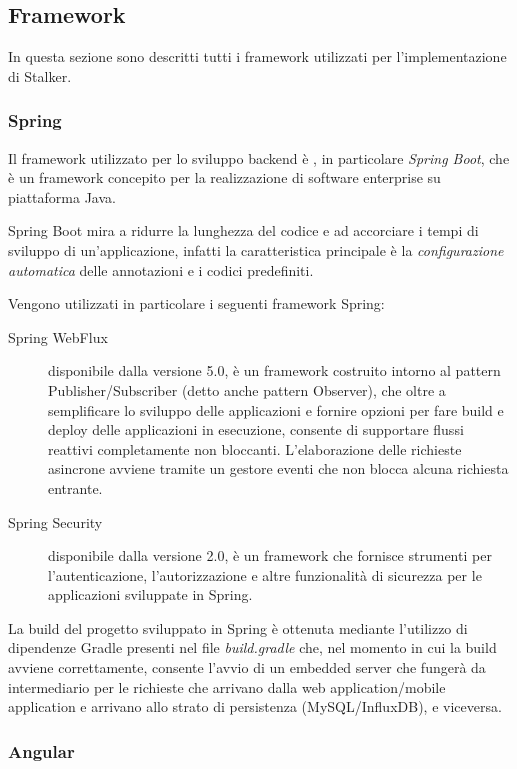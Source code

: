\documentclass[../manuale-sviluppatore.tex]{subfiles}
\begin{document}
\subsection{Framework}%
\label{sub:framework}
In questa sezione sono descritti tutti i framework utilizzati per l'implementazione di Stalker.

\subsubsection{Spring}%
\label{subs:spring}

Il framework utilizzato per lo sviluppo backend è , in particolare \textit{Spring Boot}, che è un framework concepito per la realizzazione di software enterprise su piattaforma Java.

Spring Boot mira a ridurre la lunghezza del codice e ad accorciare i tempi di sviluppo di un'applicazione, infatti la caratteristica principale è la \textit{configurazione automatica} delle annotazioni e i codici predefiniti.

Vengono utilizzati in particolare i seguenti framework Spring:
\begin{description}
  \item[Spring WebFlux] disponibile dalla versione 5.0, è un framework costruito intorno al pattern Publisher/Subscriber (detto anche pattern Observer), che oltre a semplificare lo sviluppo delle applicazioni e fornire opzioni per fare build e deploy delle applicazioni in esecuzione, consente di supportare flussi reattivi completamente non bloccanti. L'elaborazione delle richieste asincrone avviene tramite un gestore eventi che non blocca alcuna richiesta entrante.
  \item[Spring Security] disponibile dalla versione 2.0, è un framework che fornisce strumenti per l'autenticazione, l'autorizzazione e altre funzionalità di sicurezza per le applicazioni sviluppate in Spring.
\end{description}

La build del progetto sviluppato in Spring è ottenuta mediante l'utilizzo di dipendenze Gradle presenti nel file \textit{build.gradle} che, nel momento in cui la build avviene correttamente, consente l'avvio di un embedded server che fungerà da intermediario per le richieste che arrivano dalla web application/mobile application e arrivano allo strato di persistenza (MySQL/InfluxDB), e viceversa.

\subsubsection{Angular}%
\label{subs:angular}
\end{document}
